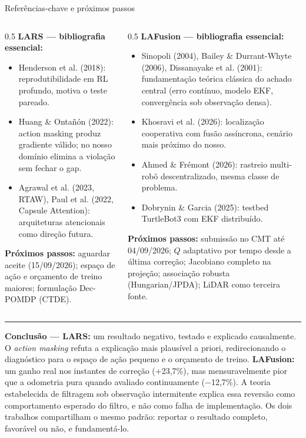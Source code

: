 \documentclass[aspectratio=169]{beamer}
\begin{document}
\begin{frame}{Referências-chave e próximos passos}
\begin{columns}[T]
\begin{column}{0.5\textwidth}
\textbf{LARS — bibliografia essencial:}
\tiny
\begin{itemize}
\item Henderson et al. (2018): reprodutibilidade em RL profundo, motiva o teste pareado.
\item Huang \& Ontañón (2022): action masking produz gradiente válido; no nosso domínio elimina a violação sem fechar o gap.
\item Agrawal et al. (2023, RTAW), Paul et al. (2022, Capsule Attention): arquiteturas atencionais como direção futura.
\end{itemize}
\vspace{0.1cm}
\textbf{Próximos passos:} aguardar aceite (15/09/2026); espaço de ação e orçamento de treino maiores; formulação Dec-POMDP (CTDE).
\end{column}
\begin{column}{0.5\textwidth}
\textbf{LAFusion — bibliografia essencial:}
\tiny
\begin{itemize}
\item Sinopoli (2004), Bailey \& Durrant-Whyte (2006), Dissanayake et al. (2001): fundamentação teórica clássica do achado central (erro contínuo, modelo EKF, convergência sob observação densa).
\item Khosravi et al. (2026): localização cooperativa com fusão assíncrona, cenário mais próximo do nosso.
\item Ahmed \& Frémont (2026): rastreio multi-robô descentralizado, mesma classe de problema.
\item Dobrynin \& Garcia (2025): testbed TurtleBot3 com EKF distribuído.
\end{itemize}
\vspace{0.1cm}
\textbf{Próximos passos:} submissão no CMT até 04/09/2026; $Q$ adaptativo por tempo desde a última correção; Jacobiano completo na projeção; associação robusta (Hungarian/JPDA); LiDAR como terceira fonte.
\end{column}
\end{columns}

\vspace{0.2cm}
\hrule
\vspace{0.15cm}
\scriptsize
\textbf{Conclusão — LARS:} um resultado negativo, testado e explicado causalmente. O \emph{action masking} refuta a explicação mais plausível a priori, redirecionando o diagnóstico para o espaço de ação pequeno e o orçamento de treino. \textbf{LAFusion:} um ganho real nos instantes de correção (+23,7\%), mas mensuravelmente pior que a odometria pura quando avaliado continuamente ($-$12,7\%). A teoria estabelecida de filtragem sob observação intermitente explica essa reversão como comportamento esperado do filtro, e não como falha de implementação. Os dois trabalhos compartilham o mesmo padrão: reportar o resultado completo, favorável ou não, e fundamentá-lo.
\end{frame}
\end{document}
